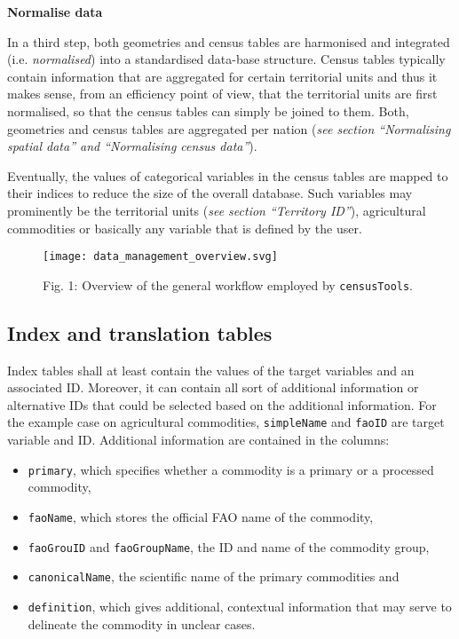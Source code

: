 \documentclass[12pt,]{article}
\providecommand{\tightlist}{%
  \setlength{\itemsep}{0pt}\setlength{\parskip}{0pt}}
\begin{document}
\textbf{Normalise data}

In a third step, both geometries and census tables are harmonised and integrated (i.e. \emph{normalised}) into a standardised data-base structure.
Census tables typically contain information that are aggregated for certain territorial units and thus it makes sense, from an efficiency point of view, that the territorial units are first normalised, so that the census tables can simply be joined to them.
Both, geometries and census tables are aggregated per nation (\emph{see section ``Normalising spatial data'' and ``Normalising census data''}).

Eventually, the values of categorical variables in the census tables are mapped to their indices to reduce the size of the overall database.
Such variables may prominently be the territorial units (\emph{see section ``Territory ID''}), agricultural commodities or basically any variable that is defined by the user.

\begin{figure}
\centering
\texttt{[image: data\_management\_overview.svg]}
\caption{Fig. 1: Overview of the general workflow employed by \texttt{censusTools}.}
\end{figure}

\hypertarget{index-and-translation-tables}{%
\subsection{Index and translation tables}\label{index-and-translation-tables}}

Index tables shall at least contain the values of the target variables and an associated ID. Moreover, it can contain all sort of additional information or alternative IDs that could be selected based on the additional information. For the example case on agricultural commodities, \texttt{simpleName} and \texttt{faoID} are target variable and ID. Additional information are contained in the columns:

\begin{itemize}
\tightlist
\item
  \texttt{primary}, which specifies whether a commodity is a primary or a processed commodity,
\item
  \texttt{faoName}, which stores the official FAO name of the commodity,
\item
  \texttt{faoGrouID} and \texttt{faoGroupName}, the ID and name of the commodity group,
\item
  \texttt{canonicalName}, the scientific name of the primary commodities and
\item
  \texttt{definition}, which gives additional, contextual information that may serve to delineate the commodity in unclear cases.
\end{itemize}
\end{document}
